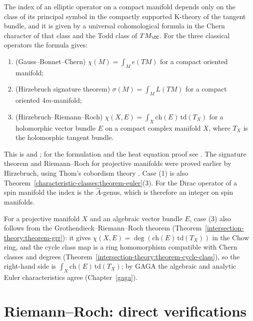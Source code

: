 \begin{theorem}\label{intersection-theory:theorem-atiyah-singer}
The index of an elliptic operator on a compact manifold depends only on the class of its principal symbol in the compactly supported K-theory of the tangent bundle, and it is given by a universal cohomological formula in
the Chern character of that class and the Todd class of $TM_\CC$. For the three classical operators the formula gives:
\begin{enumerate}
\item (Gauss--Bonnet--Chern) $\chi(M) = \int_Me(TM)$ for a compact oriented manifold;
\item (Hirzebruch signature theorem) $\sigma(M) = \int_ML(TM)$ for a compact oriented $4m$-manifold;
\item (Hirzebruch--Riemann--Roch) $\chi(X, E) = \int_X\mathrm{ch}(E)\,\mathrm{td}(T_X)$ for a holomorphic vector bundle $E$ on a compact complex manifold $X$, where $T_X$ is the holomorphic tangent bundle.
\end{enumerate}
\end{theorem}

This is \cite{atiyah-singer-1968-1} and \cite{atiyah-singer-1968-3}; for the formulation and the heat equation proof see \cite{lawson-michelsohn}. The signature theorem and Riemann--Roch for projective manifolds were proved
earlier by Hirzebruch, using Thom's cobordism theory \cite{hirzebruch-topological}. Case (1) is also Theorem~\ref{characteristic-classes:theorem-euler}(3). For the Dirac operator of a spin manifold the index is the
$\hat A$-genus, which is therefore an integer on spin manifolds.

\begin{remark}\label{intersection-theory:remark-grr}
For a projective manifold $X$ and an algebraic vector bundle $E$, case (3) also follows from the Grothendieck--Riemann--Roch theorem (Theorem~\ref{intersection-theory:theorem-grr}): it gives
$\chi(X, E) = \deg(\mathrm{ch}(E)\,\mathrm{td}(T_X))$ in the Chow ring, and the cycle class map is a ring homomorphism compatible with Chern classes and degrees (Theorem~\ref{intersection-theory:theorem-cycle-class}), so the right-hand
side is $\int_X\mathrm{ch}(E)\,\mathrm{td}(T_X)$; by GAGA the algebraic and analytic Euler characteristics agree (Chapter~\ref{gaga}).
\end{remark}

\section{Riemann--Roch: direct verifications}\label{intersection-theory:section-verifications}

